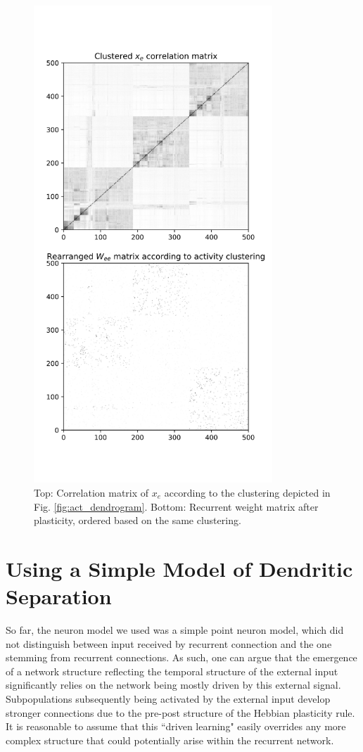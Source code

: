 \documentclass[10pt,a4paper]{article}
\begin{document}
\begin{figure}
\includegraphics[width=0.8\textwidth]{../plots/corr_weight_mat.png}
\caption{\label{fig:corr_weight_mat} Top: Correlation matrix of $x_e$ according to the clustering depicted in Fig. \ref{fig:act_dendrogram}. Bottom: Recurrent weight matrix after plasticity, ordered based on the same clustering.}
\end{figure}

\section{Using a Simple Model of Dendritic Separation}
So far, the neuron model we used was a simple point neuron model, which did not distinguish between input received by recurrent connection and the one stemming from recurrent connections. As such, one can argue that the emergence of a network structure reflecting the temporal structure of the external input significantly relies on the network being mostly driven by this external signal. Subpopulations subsequently being activated by the external input develop stronger connections due to the pre-post structure of the Hebbian plasticity rule. It is reasonable to assume that this ``driven learning" easily overrides any more complex structure that could potentially arise within the recurrent network.
\end{document}
